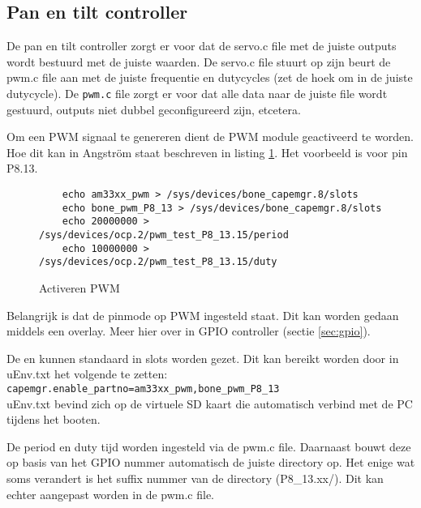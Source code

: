 \subsection{Pan en tilt controller}

De pan en tilt controller zorgt er voor dat de servo.c file met de juiste outputs
wordt bestuurd met de juiste waarden. De servo.c file stuurt op zijn beurt de pwm.c
file aan met de juiste frequentie en dutycycles (zet de hoek om in de juiste
dutycycle). De \texttt{pwm.c} file zorgt er voor dat alle data naar de juiste
file wordt gestuurd, outputs niet dubbel geconfigureerd zijn, etcetera.

Om een PWM signaal te genereren dient de PWM module geactiveerd te worden. Hoe
dit kan in Angström staat beschreven in listing \ref{lst:pwm-activation}. Het
voorbeeld is voor pin P8.13.

\begin{figure}
    \begin{verbatim}
    echo am33xx_pwm > /sys/devices/bone_capemgr.8/slots
    echo bone_pwm_P8_13 > /sys/devices/bone_capemgr.8/slots
    echo 20000000 > /sys/devices/ocp.2/pwm_test_P8_13.15/period
    echo 10000000 > /sys/devices/ocp.2/pwm_test_P8_13.15/duty
    \end{verbatim}
    \caption{Activeren PWM}
    \label{lst:pwm-activation}
\end{figure}


Belangrijk is dat de pinmode op PWM ingesteld staat. Dit kan worden gedaan
middels een overlay. Meer hier over in GPIO controller (sectie \ref{sec:gpio}).

De  en  kunnen standaard in slots
worden gezet. Dit kan bereikt worden door in uEnv.txt het volgende te zetten:
\\
\texttt{capemgr.enable\_partno=am33xx\_pwm,bone\_pwm\_P8\_13}
\\
uEnv.txt bevind zich op de virtuele SD kaart die automatisch verbind met de PC
tijdens het booten.

De period en duty tijd worden ingesteld via de pwm.c file. Daarnaast bouwt deze op
basis van het GPIO nummer automatisch de juiste directory op. Het enige wat
soms verandert is het suffix nummer van de directory (P8\_13.xx/). Dit kan echter
aangepast worden in de pwm.c file.

